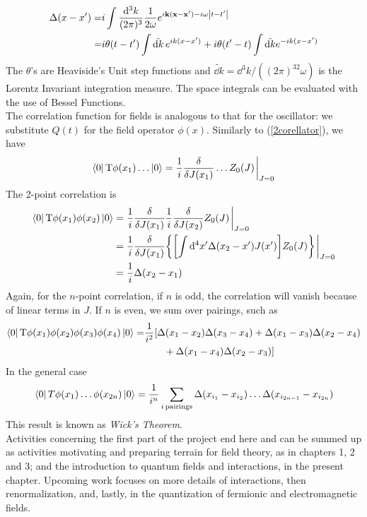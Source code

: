 \begin{equation}
\begin{aligned}
       \Delta(x-x^\prime)=&i\int\frac{\dd^3 k}{(2\pi)^3}\frac{1}{2\omega}e^{i\vb{k}(\vb{x}-\vb{x}^\prime)-i\omega\abs{t-t^\prime}}\\
       =&i\theta(t-t^\prime)\int\tilde{\dd k}\,e^{ik(x-x^\prime)}+i\theta(t^\prime-t )\int\tilde{\dd k}e^{-ik(x-x^\prime)}
\end{aligned}
\end{equation}
The $\theta$'s are Heaviside's Unit step functions and $\tilde{\dd k}=\dd^3k/((2\pi)^32\omega)$ is the Lorentz Invariant integration measure. The space integrals can be evaluated with the use of Bessel Functions. \\

The correlation function for fields is analogous to that for the oscillator: we substitute $Q(t)$ for the field operator $\phi(x)$. Similarly to (\ref{2corellator}), we have
\begin{equation}
    \bra{0}\text{T}\phi(x_1)\dots\ket{0}=\frac{1}{i}\fdv{J(x_1)}\dots Z_0(J)\eval_{J=0}
\end{equation}
The 2-point correlation is
\begin{equation}
    \begin{aligned}
    \bra{0}\text{T}\phi(x_1)\phi(x_2)\ket{0}&=\frac{1}{i}\fdv{J(x_1)}\frac{1}{i}\fdv{J(x_2)}Z_0(J)\eval_{J=0}\\
    &=\frac{1}{i}\fdv{J(x_1)}\qty{\qty[\int\dd^4x^\prime\Delta(x_2-x^\prime)J(x^\prime)]Z_0(J)}\eval_{J=0}\\
    &=\frac{1}{i}\Delta(x_2-x_1)
\end{aligned}
\end{equation}
Again, for the $n$-point correlation, if $n$
is odd, the correlation will vanish because of linear terms in $J$. If $n$ is even, we sum over pairings, such as 
\begin{align}
    \bra{0}\text{T}\phi(x_1)\phi(x_2)\phi(x_3)\phi(x_4)\ket{0}=&\frac{1}{i^2}[\Delta(x_1-x_2)\Delta(x_3-x_4)+\Delta(x_1-x_3)\Delta(x_2-x_4)\nonumber\\&\qquad+\Delta(x_1-x_4)\Delta(x_2-x_3)]
\end{align}
In the general case
\begin{equation}
    \bra{0}T\phi(x_1)\dots\phi(x_{2n})\ket{0}=\frac{1}{i^n}\sum_{i\,\text{pairings}}\Delta(x_{i_1}-x_{i_2})\dots\Delta(x_{i_{2n-1}}-x_{i_{2n}})
\end{equation}
This result is known as \textit{Wick's Theorem}.\\

Activities concerning the first part of the project end here and can be summed up as activities motivating and preparing terrain for field theory, as  in chapters 1, 2 and 3; and the introduction to quantum fields and interactions, in the present chapter. Upcoming work  focuses on more details of interactions, then renormalization, and, lastly, in the quantization of fermionic and electromagnetic fields.